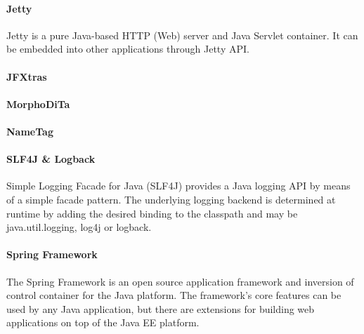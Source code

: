 \paragraph{Jetty}
Jetty is a pure Java-based HTTP (Web) server and Java Servlet container. It can
be embedded into other applications through Jetty API.

\paragraph{JFXtras}

\paragraph{MorphoDiTa}
\paragraph{NameTag}

\paragraph{SLF4J \& Logback}
Simple Logging Facade for Java (SLF4J) provides a Java logging API by means
of a simple facade pattern. The underlying logging backend is determined
at runtime by adding the desired binding to the classpath and may be
java.util.logging, log4j or logback.

\paragraph{Spring Framework}
The Spring Framework is an open source application framework and inversion
of control container for the Java platform. The framework's core features
can be used by any Java application, but there are extensions for building
web applications on top of the Java EE platform.